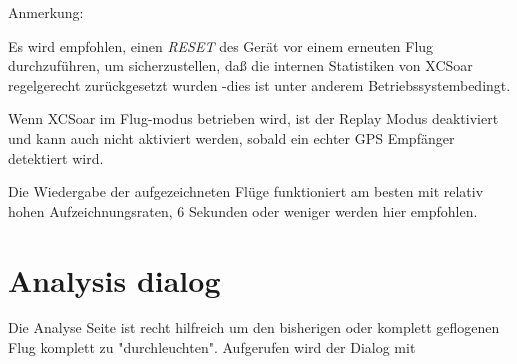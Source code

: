 Anmerkung:

Es wird empfohlen, einen \textsl{RESET}  des  Gerät vor einem erneuten Flug durchzuführen, um sicherzustellen, daß die internen Statistiken von \textsf{XCSoar} regelgerecht zurückgesetzt wurden -dies ist unter anderem Betriebssystembedingt.

Wenn \textsf{XCSoar} im Flug-modus betrieben wird, ist der Replay Modus deaktiviert und kann auch nicht aktiviert werden, sobald ein echter GPS Empfänger detektiert wird.

Die Wiedergabe der aufgezeichneten Flüge funktioniert am besten mit relativ hohen Aufzeichnungsraten, 6 Sekunden oder weniger werden hier empfohlen.

\section{Analysis dialog}\label{sec:analysis-dialog-climb}

Die Analyse Seite ist recht hilfreich um den bisherigen oder komplett geflogenen Flug komplett zu "durchleuchten".  Aufgerufen wird der Dialog mit
\begin{quote}
\blink{}
\end{quote}

